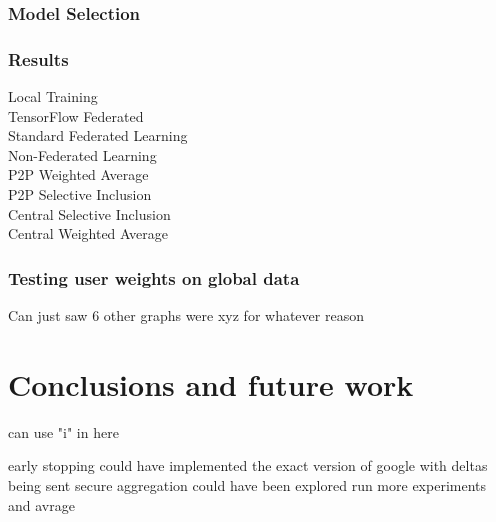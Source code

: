 \documentclass[12pt]{article}
\begin{document}
\subsubsection{Model Selection}
\subsubsection{Results}
Local Training\\
TensorFlow Federated\\
Standard Federated Learning\\
Non-Federated Learning\\
P2P Weighted Average\\
P2P Selective Inclusion\\
Central Selective Inclusion\\
Central Weighted Average\\
\subsubsection{Testing user weights on global data}
Can just saw 6 other graphs were xyz for whatever reason
\clearpage
\section{Conclusions and future work}
can use "i" in here

early stopping
could have implemented the exact version of google with deltas being sent
secure aggregation could have been explored
run more experiments and avrage
\clearpage
\printbibliography[title={Bibliography}]
\end{document}
